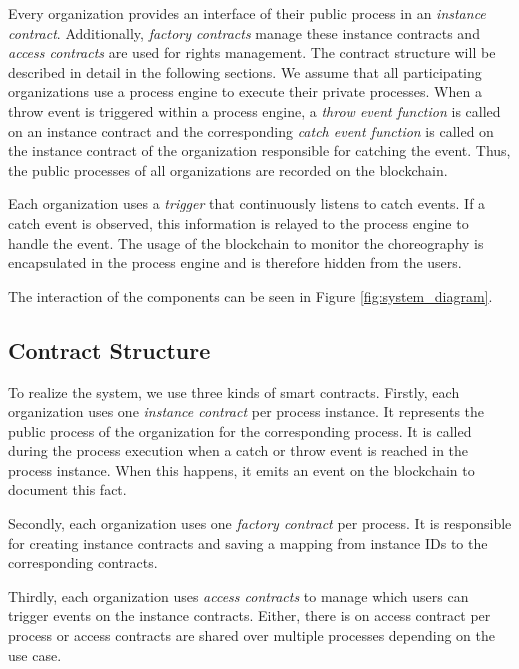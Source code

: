 \documentclass[runningheads]{llncs}
\begin{document}
Every organization provides an interface of their public process in an \emph{instance contract}.
Additionally, \emph{factory contracts} manage these instance contracts and \emph{access contracts} are used for rights management.
The contract structure will be described in detail in the following sections.
We assume that all participating organizations use a process engine to execute their private processes.
When a throw event is triggered within a process engine, a \emph{throw event function} is called on an instance contract and the corresponding \emph{catch event function} is called on the instance contract of the organization responsible for catching the event.
Thus, the public processes of all organizations are recorded on the blockchain.

Each organization uses a \emph{trigger} that continuously listens to catch events.
If a catch event is observed, this information is relayed to the process engine to handle the event.
The usage of the blockchain to monitor the choreography is encapsulated in the process engine and is therefore hidden from the users.

The interaction of the components can be seen in Figure \ref{fig:system_diagram}.

\subsection{Contract Structure}
To realize the system, we use three kinds of smart contracts.
Firstly, each organization uses one \emph{instance contract} per process instance.
It represents the public process of the organization for the corresponding process.
It is called during the process execution when a catch or throw event is reached in the process instance.
When this happens, it emits an event on the blockchain to document this fact.

Secondly, each organization uses one \emph{factory contract} per process.
It is responsible for creating instance contracts and saving a mapping from instance IDs to the corresponding contracts.

Thirdly, each organization uses \emph{access contracts} to manage which users can trigger events on the instance contracts.
Either, there is on access contract per process or access contracts are shared over multiple processes depending on the use case.
\end{document}
